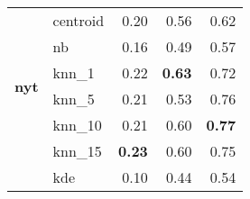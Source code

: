 \documentclass{article}
\begin{document}
\begin{table}
\begin{tabular}{llrrr}
        \midrule
        \multirow{6}{*}{\bfseries nyt} &  centroid &                          0.20 &               0.56 &            0.62 \\
                                       &        nb &                          0.16 &               0.49 &            0.57 \\
                                       &     knn\_1 &                         0.22 &   \bfseries   0.63 &            0.72 \\
                                       &     knn\_5 &                         0.21 &               0.53 &            0.76 \\
                                       &    knn\_10 &                         0.21 &               0.60 & \bfseries  0.77 \\
                                       &    knn\_15 &              \bfseries  0.23 &               0.60 &            0.75 \\
                                       &        kde &                         0.10 &               0.44 &            0.54 \\
        \bottomrule
    \end{tabular}
\end{table}
\end{document}
